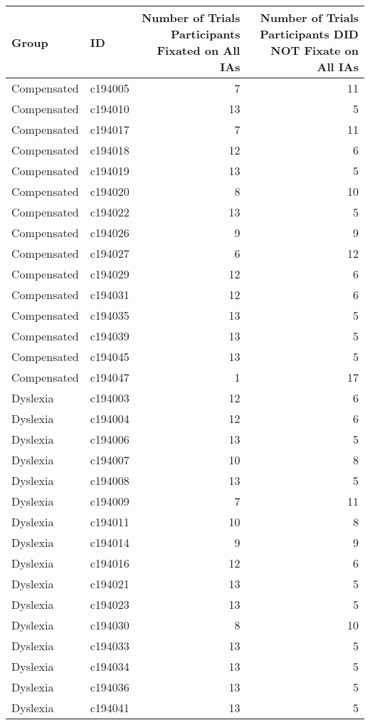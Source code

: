\documentclass[
]{article}
\begin{document}
\begin{table}[t]
\fontsize{12.0pt}{14.4pt}\selectfont
\begin{tabular*}{\linewidth}{@{\extracolsep{\fill}}llrr}
\toprule
Group & ID & Number of Trials Participants Fixated on All IAs & Number of Trials Participants DID NOT Fixate on All IAs \\ 
\midrule\addlinespace[2.5pt]
Compensated & c194005 & 7 & 11 \\ 
Compensated & c194010 & 13 & 5 \\ 
Compensated & c194017 & 7 & 11 \\ 
Compensated & c194018 & 12 & 6 \\ 
Compensated & c194019 & 13 & 5 \\ 
Compensated & c194020 & 8 & 10 \\ 
Compensated & c194022 & 13 & 5 \\ 
Compensated & c194026 & 9 & 9 \\ 
Compensated & c194027 & 6 & 12 \\ 
Compensated & c194029 & 12 & 6 \\ 
Compensated & c194031 & 12 & 6 \\ 
Compensated & c194035 & 13 & 5 \\ 
Compensated & c194039 & 13 & 5 \\ 
Compensated & c194045 & 13 & 5 \\ 
Compensated & c194047 & 1 & 17 \\ 
Dyslexia & c194003 & 12 & 6 \\ 
Dyslexia & c194004 & 12 & 6 \\ 
Dyslexia & c194006 & 13 & 5 \\ 
Dyslexia & c194007 & 10 & 8 \\ 
Dyslexia & c194008 & 13 & 5 \\ 
Dyslexia & c194009 & 7 & 11 \\ 
Dyslexia & c194011 & 10 & 8 \\ 
Dyslexia & c194014 & 9 & 9 \\ 
Dyslexia & c194016 & 12 & 6 \\ 
Dyslexia & c194021 & 13 & 5 \\ 
Dyslexia & c194023 & 13 & 5 \\ 
Dyslexia & c194030 & 8 & 10 \\ 
Dyslexia & c194033 & 13 & 5 \\ 
Dyslexia & c194034 & 13 & 5 \\ 
Dyslexia & c194036 & 13 & 5 \\ 
Dyslexia & c194041 & 13 & 5 \\ 

\end{tabular*}
\end{table}
\end{document}
